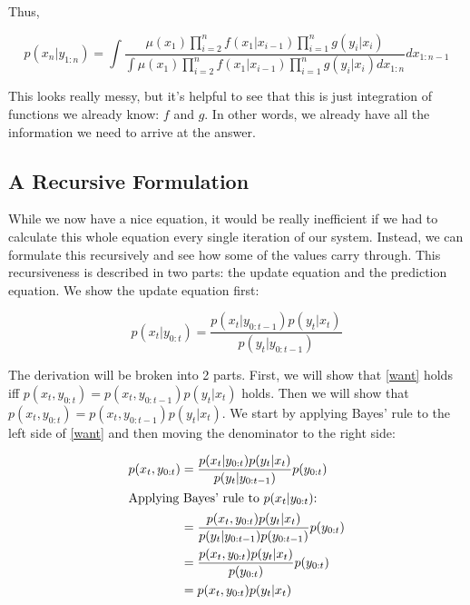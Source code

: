 \documentclass{article}
\begin{document}
Thus,

\begin{equation}
p(x_n|y_{1:n}) = \int \frac{\mu(x_1)\prod_{i=2}^{n} f(x_1|x_{i-1})\prod_{i=1}^{n} g(y_i|x_i)}{\int \mu(x_1)\prod_{i=2}^{n} f(x_1|x_{i-1})\prod_{i=1}^{n} g(y_i|x_i) dx_{1:n}} dx_{1:n-1}
\end{equation}

This looks really messy, but it's helpful to see that this is just integration of functions we already know: $f$ and $g$. In other words, we already have all the information we need to arrive at the answer.

\subsection{A Recursive Formulation}
While we now have a nice equation, it would be really inefficient if we had to calculate this whole equation every single iteration of our system. Instead, we can formulate this recursively and see how some of the values carry through. This recursiveness is described in two parts: the update equation and the prediction equation. We show the update equation first:

\begin{equation} \label{want}
p(x_t|y_{0:t}) = \frac{p(x_t|y_{0:t-1})p(y_t|x_t)}{p(y_t|y_{0:t-1})}
\end{equation}

The derivation will be broken into 2 parts. First, we will show that \eqref{want} holds iff $p(x_t,y_{0:t}) = p(x_t,y_{0:t-1})p(y_t|x_t)$ holds. Then we will show that $p(x_t,y_{0:t}) = p(x_t,y_{0:t-1})p(y_t|x_t)$. We start by applying Bayes' rule to the left side of \eqref{want} and then moving the denominator to the right side:

\begin{align*}
p(x_t,y_{0:t}) &= \frac{p(x_t|y_{0:t})p(y_t|x_t)}{p(y_t|y_{0:t-1})}p(y_{0:t}) \\
\intertext{Applying Bayes' rule to $p(x_t|y_{0:t})$:}
&= \frac{p(x_t,y_{0:t})p(y_t|x_t)}{p(y_t|y_{0:t-1})p(y_{0:t-1})}p(y_{0:t}) \\
&= \frac{p(x_t,y_{0:t})p(y_t|x_t)}{p(y_{0:t})}p(y_{0:t}) \\
&= p(x_t,y_{0:t})p(y_t|x_t)
\end{align*}
\end{document}
